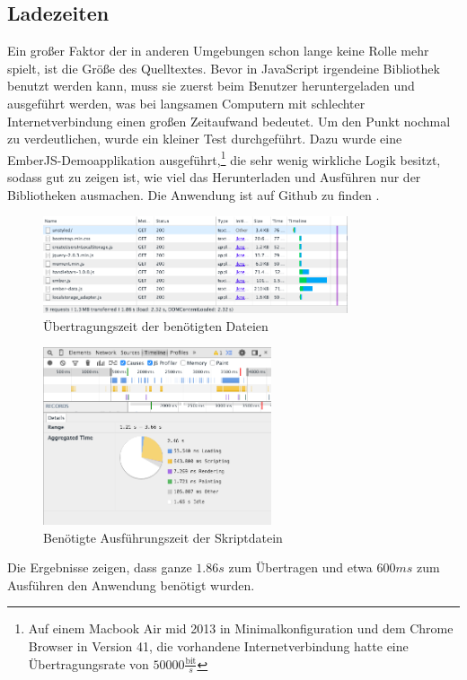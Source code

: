 \documentclass[12pt,twoside]{book}
\begin{document}
\subsection{Ladezeiten}\label{sec:loadingtimes}

Ein großer Faktor der in anderen Umgebungen schon lange keine Rolle mehr spielt, ist die Größe des Quelltextes. Bevor in JavaScript irgendeine Bibliothek benutzt werden kann, muss sie zuerst beim Benutzer heruntergeladen und ausgeführt werden, was bei langsamen Computern mit schlechter Internetverbindung einen großen Zeitaufwand bedeutet. Um den Punkt nochmal zu verdeutlichen, wurde ein kleiner Test durchgeführt. Dazu wurde eine EmberJS-Demoapplikation ausgeführt,\footnote{Auf einem Macbook Air mid 2013 in Minimalkonfiguration und dem Chrome Browser in Version 41, die vorhandene Internetverbindung hatte eine Übertragungsrate von $50000 \frac{\text{bit}}{s}$} die sehr wenig wirkliche Logik besitzt, sodass gut zu zeigen ist, wie viel das Herunterladen und Ausführen nur der Bibliotheken ausmachen.
Die Anwendung ist auf Github zu finden \cite{embercrud}.
\begin{figure}[htbp]
    \centering
    \includegraphics[width=0.8\textwidth]{images/performance_1.png}
    \caption{Übertragungszeit der benötigten Dateien}
    \label{fig:loadtimes}
\end{figure}
\begin{figure}[htbp]
    \centering
    \includegraphics[width=0.6\textwidth]{images/performance_2.png}
    \caption{Benötigte Ausführungszeit der Skriptdatein}
    \label{fig:executiontime}
\end{figure}
Die Ergebnisse zeigen, dass ganze $1.86s$ zum Übertragen und etwa $600ms$ zum Ausführen den Anwendung benötigt wurden.
\end{document}
